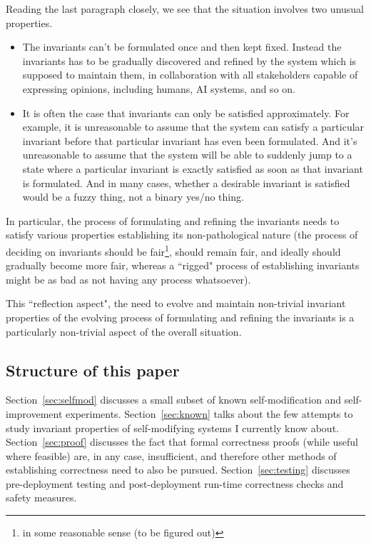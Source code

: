 \documentclass{article}
\begin{document}
Reading the last paragraph closely, we see that the situation involves two unusual properties.

\begin{itemize}

\item The invariants can't be formulated once and then kept fixed. Instead the invariants has to be
gradually discovered and refined by the system which is supposed to maintain them, in collaboration with
all stakeholders capable of expressing opinions, including humans, AI systems, and so on.

\item It is often the case that invariants can only be satisfied approximately. For example, it is unreasonable
to assume that the system can satisfy a particular invariant before that particular invariant has even been
formulated. And it's unreasonable to assume that the system will be able to suddenly jump to a state where
a particular invariant is exactly satisfied as soon as that invariant is formulated. And in many cases,
whether a desirable invariant is satisfied would be a fuzzy thing, not a binary yes/no thing.

\end{itemize}

In particular, the process of formulating and refining the invariants needs to satisfy various properties
establishing its non-pathological nature (the process of deciding on invariants should be fair\footnote{in some
reasonable sense (to be figured out)},
should remain fair, and ideally should gradually become more fair, whereas a ``rigged" process of establishing
invariants might be as bad as not having any process whatsoever).

This ``reflection aspect", the need to evolve and maintain non-trivial invariant properties of the evolving process of formulating and
refining the invariants is a particularly non-trivial aspect of the overall situation.

\subsection{Structure of this paper}

Section~\ref{sec:selfmod} discusses a small subset of known self-modification and self-improvement experiments.
Section~\ref{sec:known} talks about the few attempts to study invariant properties of self-modifying systems
I currently know about. Section~\ref{sec:proof} discusses the fact that formal correctness proofs (while useful where feasible) are,
in any case, insufficient, and therefore other methods of establishing correctness need to also be pursued.
Section~\ref{sec:testing} discusses pre-deployment testing and post-deployment run-time correctness
checks and safety measures.
\end{document}
